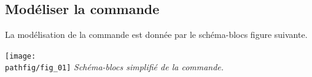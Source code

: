 \documentclass[10pt,fleqn]{article} %
\begin{document}
\subsection{Modéliser la commande}


La modélisation de la commande est donnée par le schéma-blocs figure suivante.%


\begin{center}
\texttt{[image: \\pathfig/fig\_01]}
%
%
\textit{Schéma-blocs simplifié de la commande. \label{chap2:tele:complet}}
\end{center}
\end{document}
